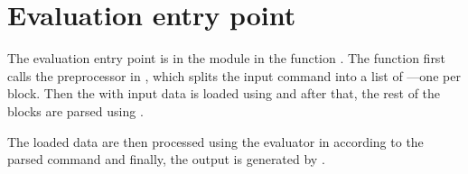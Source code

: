 \section{Evaluation entry point}
The evaluation entry point is in the module  in the function . 
The function first calls the preprocessor in , which splits the input command into a list of ---one  per block. 
Then the  with input data is loaded using  and after that,
the rest of the blocks are parsed using . 

The loaded data are then processed using the evaluator in
 according to the parsed command and finally, the output is generated by .



